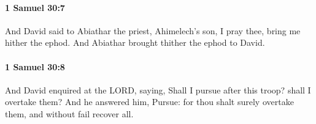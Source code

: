 		\paragraph{1 Samuel 30:7} %
			\label{1SAMUEL-30-7}

			And David said to Abiathar the priest, Ahimelech’s son, I pray thee, bring me hither the ephod. And Abiathar brought thither the ephod to David.


		\paragraph{1 Samuel 30:8} %
			\label{1SAMUEL-30-8}

			And David enquired at the LORD, saying, Shall I pursue after this troop? shall I overtake them? And he answered him, Pursue: for thou shalt surely overtake them, and without fail recover all.


